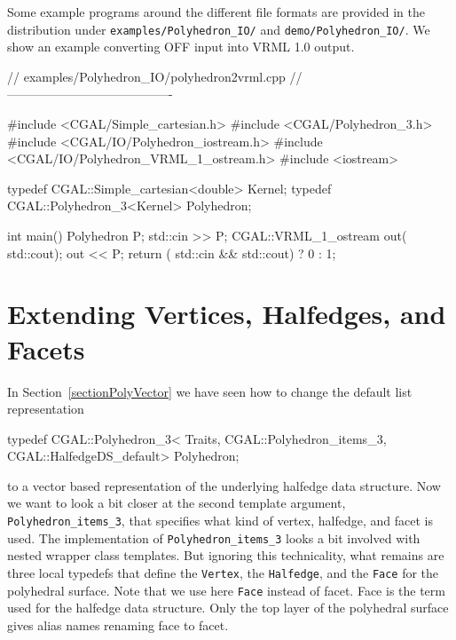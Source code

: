 Some example programs around the different file formats are provided
in the distribution under \texttt{examples/Polyhedron\_IO/} and
\texttt{demo/Polyhedron\_IO/}. We show an example converting OFF input
into VRML 1.0 output.

\begin{ccExampleCode}
// examples/Polyhedron_IO/polyhedron2vrml.cpp
// ----------------------------------------

#include <CGAL/Simple_cartesian.h>
#include <CGAL/Polyhedron_3.h>
#include <CGAL/IO/Polyhedron_iostream.h>
#include <CGAL/IO/Polyhedron_VRML_1_ostream.h> 
#include <iostream>

typedef CGAL::Simple_cartesian<double> Kernel;
typedef CGAL::Polyhedron_3<Kernel>     Polyhedron;

int main() {
    Polyhedron P;
    std::cin >> P;
    CGAL::VRML_1_ostream out( std::cout);
    out << P;
    return ( std::cin && std::cout) ? 0 : 1;
}
\end{ccExampleCode}



\section{Extending Vertices, Halfedges, and Facets}
\label{sectionPolyExtend}

In Section~\ref{sectionPolyVector} we have seen how to change the 
default list representation

\begin{ccExampleCode}
typedef CGAL::Polyhedron_3< Traits, 
                            CGAL::Polyhedron_items_3, 
                            CGAL::HalfedgeDS_default>      Polyhedron;
\end{ccExampleCode}

to a vector based representation of the underlying halfedge data
structure. Now we want to look a bit closer at the second template argument,
\texttt{Polyhedron\_items\_3}, that specifies what kind of vertex, 
halfedge, and facet is used. The implementation of 
\texttt{Polyhedron\_items\_3} looks a bit involved with nested 
wrapper class templates. But ignoring this technicality, what remains
are three local typedefs that define the \texttt{Vertex}, the
\texttt{Halfedge}, and the \texttt{Face} for the polyhedral surface.
Note that we use here \texttt{Face} instead of facet. Face is the term
used for the halfedge data structure. Only the top layer of the
polyhedral surface gives alias names renaming face to facet.

